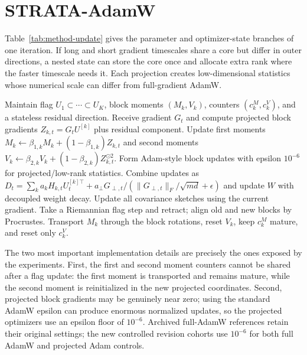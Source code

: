 \section{STRATA-AdamW}
Table~\ref{tab:method-update} gives the parameter and optimizer-state branches of one iteration. If long and short gradient timescales share a core but differ in outer directions, a nested state can store the core once and allocate extra rank where the faster timescale needs it. Each projection creates low-dimensional statistics whose numerical scale can differ from full-gradient AdamW.

\begin{algorithm*}[t]
\caption{STRATA-AdamW for one matrix parameter}
\label{alg:strata}
\begin{algorithmic}[1]
\STATE Maintain flag $U_1\subset\cdots\subset U_K$, block moments $(M_k,V_k)$, counters $(c^M_k,c^V_k)$, and a stateless residual direction.
\STATE Receive gradient $G_t$ and compute projected block gradients $Z_{k,t}=G_t U^{[k]}$ plus residual component.
\STATE Update first moments $M_k\leftarrow \beta_{1,k}M_k+(1-\beta_{1,k})Z_{k,t}$ and second moments $V_k\leftarrow \beta_{2,k}V_k+(1-\beta_{2,k})Z_{k,t}^{\odot 2}$.
\STATE Form Adam-style block updates with epsilon $10^{-6}$ for projected/low-rank statistics.
\STATE Combine updates as $D_t=\sum_k a_kH_{k,t}U^{[k]\top}_t+a_\perp G_{\perp,t}/(\|G_{\perp,t}\|_F/\sqrt{md}+\epsilon)$ and update $W$ with decoupled weight decay.
\STATE Update all covariance sketches using the current gradient.
\STATE Take a Riemannian flag step and retract; align old and new blocks by Procrustes.
\STATE Transport $M_k$ through the block rotations, reset $V_k$, keep $c^M_k$ mature, and reset only $c^V_k$.
\ENDIF
\ENDFOR
\end{algorithmic}
\end{algorithm*}

The two most important implementation details are precisely the ones exposed by the experiments. First, the first and second moment counters cannot be shared after a flag update: the first moment is transported and remains mature, while the second moment is reinitialized in the new projected coordinates. Second, projected block gradients may be genuinely near zero; using the standard AdamW epsilon can produce enormous normalized updates, so the projected optimizers use an epsilon floor of $10^{-6}$. Archived full-AdamW references retain their original settings; the new controlled revision cohorts use $10^{-6}$ for both full AdamW and projected Adam controls.

